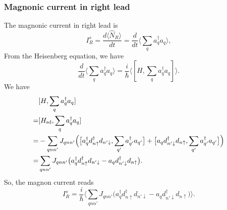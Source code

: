 \documentclass[aps,prb,superscriptaddress]{revtex4-2}
\begin{document}
\subsubsection{Magnonic current in right lead}
The magnonic current in right lead is
\begin{equation}
I_R^s = \frac{d\langle \hat N_{R}\rangle}{dt} =  \frac{d}{dt} \langle \sum_{q}a_{q}^{\dag}a_{q}\rangle,
\end{equation}
From the Heisenberg equation, we have
\begin{equation}
\frac{d}{dt} \langle \sum_{q}a_{q}^{\dag}a_{q}\rangle = \frac{i}{\hbar} \langle [H, \sum_{q}a_{q}^{\dag}a_{q}] \rangle.
\end{equation}
We have
\begin{equation}
\begin{split}
&[H, \sum_{q}a_{q}^{\dag}a_{q}] \\
= &[H_{\rm sd}, \sum_{q}a_{q}^{\dag}a_{q}]\\
= &-\sum_{qnn'} J_{qnn'} \Big(\big[a_{q}^{\dag}d_{n\uparrow}^{\dag}d_{n'\downarrow}, \sum_{q'}a_{q'}^{\dag}a_{q'}\big] + \big[a_{q}d_{n'\downarrow}^{\dag}d_{n\uparrow}, \sum_{q'}a_{q'}^{\dag}a_{q'}\big]\Big) \\
= & \sum_{qnn'} J_{qnn'} \big( a_{q}^{\dag}d_{n\uparrow}^{\dag}d_{n'\downarrow} - a_{q}d_{n'\downarrow}^{\dag}d_{n\uparrow} \big).
\end{split}
\end{equation}
So, the magnon current reads
\begin{equation}\label{eq:IRs}
I_R^s = \frac{i}{\hbar} \langle\sum_{qnn'} J_{qnn'} \big( a_{q}^{\dag}d_{n\uparrow}^{\dag}d_{n'\downarrow} - a_{q}d_{n'\downarrow}^{\dag}d_{n\uparrow} \big) \rangle.
\end{equation}
\end{document}
